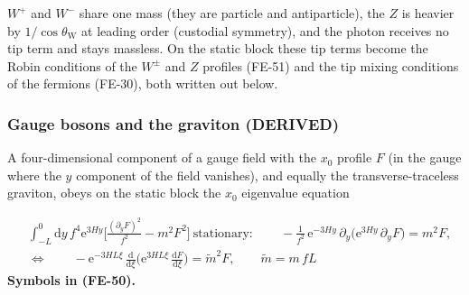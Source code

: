 \documentclass[
  10pt,
]{article}
\begin{document}
\(W^+\) and \(W^-\) share one mass (they are particle and antiparticle),
the \(Z\) is heavier by \(1/\cos\theta_{\mathrm{W}}\) at leading order
(custodial symmetry), and the photon receives no tip term and stays
massless. On the static block these tip terms become the Robin
conditions of the \(W^\pm\) and \(Z\) profiles (FE-51) and the tip
mixing conditions of the fermions (FE-30), both written out below.

\hypertarget{gauge-bosons-and-the-graviton-derived}{%
\subsubsection*{Gauge bosons and the graviton
(DERIVED)}\label{gauge-bosons-and-the-graviton-derived}}

A four-dimensional component of a gauge field with the \(x_0\) profile
\(F\) (in the gauge where the \(y\) component of the field vanishes),
and equally the transverse-traceless graviton, obeys on the static block
the \(x_0\) eigenvalue equation

\[
\begin{aligned}
&\int_{-L}^{0}\mathrm{d}y\,f^4\mathrm{e}^{3Hy}\Big[\frac{(\partial_yF)^2}{f^2} -
 m^2F^2\Big]\ \text{stationary}:\qquad
 -\frac{1}{f^2}\,\mathrm{e}^{-3Hy}\,\partial_y\big(\mathrm{e}^{3Hy}\,\partial_yF\big) = m^2F,\\
&\Leftrightarrow\qquad
 -\mathrm{e}^{-3HL\xi}\,\frac{\mathrm{d}}{\mathrm{d}\xi}\Big(\mathrm{e}^{3HL\xi}\,\frac{\mathrm{d}F}{
 \mathrm{d}\xi}\Big)
 = \tilde m^2F,\qquad \tilde m = m\,fL
\end{aligned} \tag{FE-50}
\] \textbf{Symbols in (FE-50).}
\end{document}
